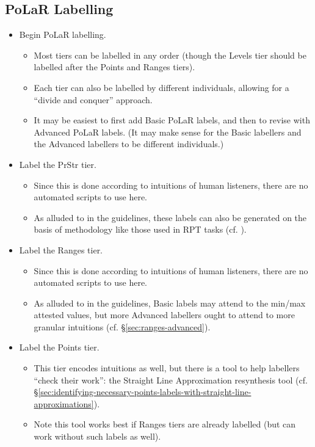 \documentclass[11pt, twoside]{memoir}
\begin{document}
\subsection{PoLaR Labelling}	
	\begin{itemize}
		\item Begin PoLaR labelling.
		\begin{itemize}
			\item Most tiers can be labelled in any order (though the Levels tier should be labelled after the Points and Ranges tiers).
			\item Each tier can also be labelled by different individuals, allowing for a “divide and conquer” approach.
			\item It may be easiest to first add Basic PoLaR labels, and then to revise with Advanced PoLaR labels. (It may make sense for the Basic labellers and the Advanced labellers to be different individuals.)
		\end{itemize}
		\item Label the PrStr tier.
		\begin{itemize}
			\item Since this is done according to intuitions of human listeners, there are no automated scripts to use here.
			\item As alluded to in the guidelines, these labels can also be generated on the basis of methodology like those used in RPT tasks (cf. \citealt{cole-14, cole-17}).
		\end{itemize}
		\item Label the Ranges tier.
		\begin{itemize}
			\item Since this is done according to intuitions of human listeners, there are no automated scripts to use here.
			\item As alluded to in the guidelines, Basic labels may attend to the min\slash max attested values, but more Advanced labellers ought to attend to more granular intuitions (cf. §\ref{sec:ranges-advanced}).
		\end{itemize}
		\item Label the Points tier.
		\begin{itemize}
			\item This tier encodes intuitions as well, but there is a tool to help labellers “check their work”:  the Straight Line Approximation resynthesis tool (cf. §\ref{sec:identifying-necessary-points-labels-with-straight-line-approximations}).
			\item Note this tool works best if Ranges tiers are already labelled (but can work without such labels as well).

\end{itemize}
\end{itemize}
\end{document}
